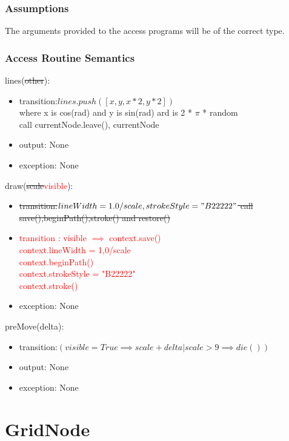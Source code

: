 \documentclass[12pt]{article}
\begin{document}
\subsubsection* {Assumptions}

The arguments provided to the access programs will be of the correct type.

\subsubsection* {Access Routine Semantics}

\noindent lines(\sout{other}):
\begin{itemize}
\item transition:$lines.push([x,y,x*2,y*2])$\\
where x is cos(rad) and y is sin(rad) ard is 2 * $\pi$ * random\\
call currentNode.leave(), currentNode\\
\item output: None
\item exception: None
\end{itemize}

\noindent draw(\sout{scale}\textcolor{red}{visible}):
\begin{itemize}
\item \sout{transition:$lineWidth = 1.0/scale, strokeStyle = "B22222"$
call save(),beginPath(),stroke() and restore()}

\item \textcolor{red}{transition : visible $\implies$ context.save()\\
				context.lineWidth = 1,0/scale\\context.beginPath()\\
				context.strokeStyle = "B22222"\\context.stroke()}
\item exception: None
\end{itemize}

\noindent preMove(delta):
\begin{itemize}
\item transition:$(visible = True \implies scale + delta | scale > 9 \implies die())$
\item output: None
\item exception: None
\end{itemize}

\newpage
\section* {GridNode}
\end{document}
